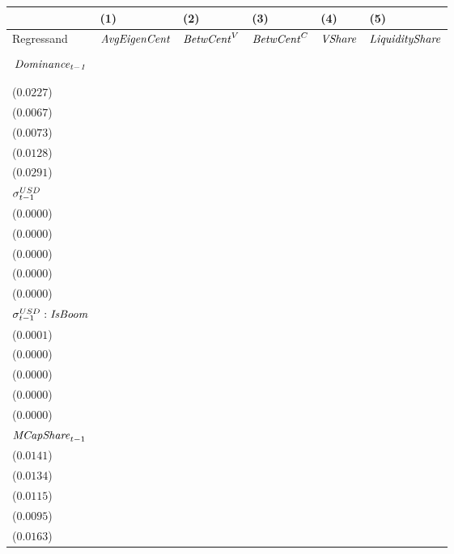 \begin{tabular}{llllll}
\toprule
{} &                                       (1) &                                       (2) &                                       (3) &                                       (4) &                                       (5) \\
\midrule
Regressand                              &                      ${\it AvgEigenCent}$ &                        ${\it BetwCent}^V$ &                        ${\it BetwCent}^C$ &                            ${\it VShare}$ &                    ${\it LiquidityShare}$ \\
$$\it Dominance_{t-1}$$                 &   \makecell{$0.8349^{***}$ \\ ($0.0227$)} &   \makecell{$0.9507^{***}$ \\ ($0.0067$)} &   \makecell{$0.9515^{***}$ \\ ($0.0073$)} &   \makecell{$0.8831^{***}$ \\ ($0.0128$)} &   \makecell{$0.9222^{***}$ \\ ($0.0291$)} \\
${\it \sigma}^{USD}_{t-1}$              &   \makecell{$-0.0001^{**}$ \\ ($0.0000$)} &      \makecell{$0.0000^{}$ \\ ($0.0000$)} &      \makecell{$0.0000^{}$ \\ ($0.0000$)} &   \makecell{$-0.0000^{**}$ \\ ($0.0000$)} &   \makecell{$-0.0000^{**}$ \\ ($0.0000$)} \\
${\it \sigma}^{USD}_{t-1}:{\it IsBoom}$ &   \makecell{$0.0002^{***}$ \\ ($0.0001$)} &     \makecell{$-0.0000^{}$ \\ ($0.0000$)} &     \makecell{$-0.0000^{}$ \\ ($0.0000$)} &   \makecell{$0.0000^{***}$ \\ ($0.0000$)} &    \makecell{$0.0000^{**}$ \\ ($0.0000$)} \\
${\it MCapShare}_{t-1}$                 &      \makecell{$0.0124^{}$ \\ ($0.0141$)} &    \makecell{$0.0333^{**}$ \\ ($0.0134$)} &   \makecell{$0.0360^{***}$ \\ ($0.0115$)} &   \makecell{$0.0311^{***}$ \\ ($0.0095$)} &   \makecell{$0.0429^{***}$ \\ ($0.0163$)} \\

\end{tabular}
